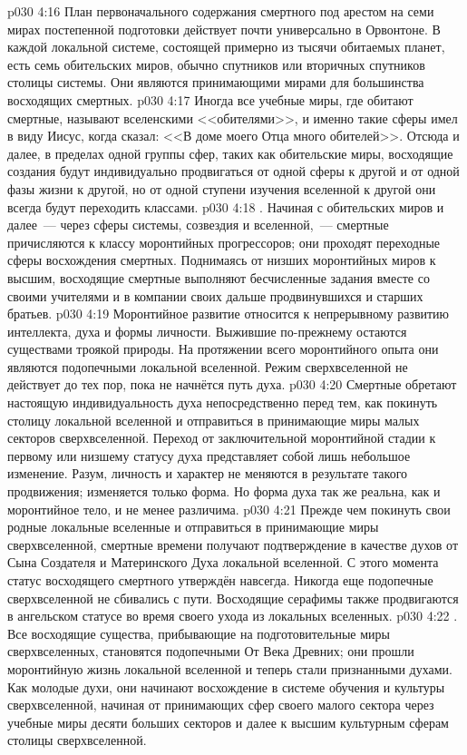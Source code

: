 \vs p030 4:16 \pc План первоначального содержания смертного под арестом на семи мирах постепенной подготовки действует почти универсально в Орвонтоне. В каждой локальной системе, состоящей примерно из тысячи обитаемых планет, есть семь обительских миров, обычно спутников или вторичных спутников столицы системы. Они являются принимающими мирами для большинства восходящих смертных.
\vs p030 4:17 Иногда все учебные миры, где обитают смертные, называют вселенскими <<обителями>>, и именно такие сферы имел в виду Иисус, когда сказал: <<В доме моего Отца много обителей>>. Отсюда и далее, в пределах одной группы сфер, таких как обительские миры, восходящие создания будут индивидуально продвигаться от одной сферы к другой и от одной фазы жизни к другой, но от одной ступени изучения вселенной к другой они всегда будут переходить классами.
\vs p030 4:18 . Начиная с обительских миров и далее~--- через сферы системы, созвездия и вселенной,~--- смертные причисляются к классу моронтийных прогрессоров; они проходят переходные сферы восхождения смертных. Поднимаясь от низших моронтийных миров к высшим, восходящие смертные выполняют бесчисленные задания вместе со своими учителями и в компании своих дальше продвинувшихся и старших братьев.
\vs p030 4:19 Моронтийное развитие относится к непрерывному развитию интеллекта, духа и формы личности. Выжившие по\hyp{}прежнему остаются существами троякой природы. На протяжении всего моронтийного опыта они являются подопечными локальной вселенной. Режим сверхвселенной не действует до тех пор, пока не начнётся путь духа.
\vs p030 4:20 Смертные обретают настоящую индивидуальность духа непосредственно перед тем, как покинуть столицу локальной вселенной и отправиться в принимающие миры малых секторов сверхвселенной. Переход от заключительной моронтийной стадии к первому или низшему статусу духа представляет собой лишь небольшое изменение. Разум, личность и характер не меняются в результате такого продвижения; изменяется только форма. Но форма духа так же реальна, как и моронтийное тело, и не менее различима.
\vs p030 4:21 Прежде чем покинуть свои родные локальные вселенные и отправиться в принимающие миры сверхвселенной, смертные времени получают подтверждение в качестве духов от Сына Создателя и Материнского Духа локальной вселенной. С этого момента статус восходящего смертного утверждён навсегда. Никогда еще подопечные сверхвселенной не сбивались с пути. Восходящие серафимы также продвигаются в ангельском статусе во время своего ухода из локальных вселенных.
\vs p030 4:22 . Все восходящие существа, прибывающие на подготовительные миры сверхвселенных, становятся подопечными От Века Древних; они прошли моронтийную жизнь локальной вселенной и теперь стали признанными духами. Как молодые духи, они начинают восхождение в системе обучения и культуры сверхвселенной, начиная от принимающих сфер своего малого сектора через учебные миры десяти больших секторов и далее к высшим культурным сферам столицы сверхвселенной.
